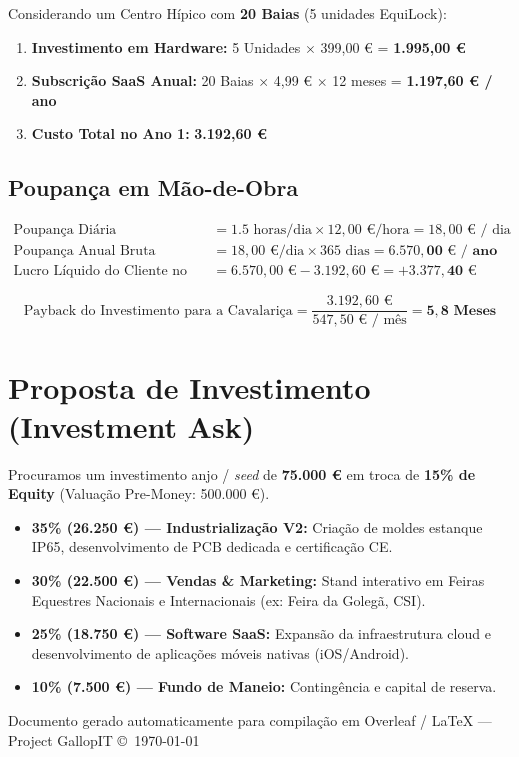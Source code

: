 \documentclass[11pt,a4paper]{article}
\begin{document}
Considerando um Centro Hípico com \textbf{20 Baias} (5 unidades EquiLock):
\begin{enumerate}
    \item \textbf{Investimento em Hardware:} 5 Unidades $\times$ 399,00 € = \textbf{1.995,00 €}
    \item \textbf{Subscrição SaaS Anual:} 20 Baias $\times$ 4,99 € $\times$ 12 meses = \textbf{1.197,60 € / ano}
    \item \textbf{Custo Total no Ano 1:} \textbf{3.192,60 €}
\end{enumerate}

\subsection{Poupança em Mão-de-Obra}
\begin{align*}
\text{Poupança Diária} &= 1.5\text{ horas/dia} \times 12,00\text{ €/hora} = 18,00\text{ € / dia} \\
\text{Poupança Anual Bruta} &= 18,00\text{ €/dia} \times 365\text{ dias} = \mathbf{6.570,00\text{ € / ano}} \\
\text{Lucro Líquido do Cliente no Ano 1} &= 6.570,00\text{ €} - 3.192,60\text{ €} = \mathbf{+3.377,40\text{ €}}
\end{align*}

\[
\text{Payback do Investimento para a Cavalariça} = \frac{3.192,60\text{ €}}{547,50\text{ € / mês}} = \mathbf{5,8\text{ Meses}}
\]

\section{Proposta de Investimento (Investment Ask)}

Procuramos um investimento anjo / \emph{seed} de \textbf{75.000 €} em troca de \textbf{15\% de Equity} (Valuação Pre-Money: 500.000 €).

\begin{highlightbox}[title=Alocação dos Fundos (75.000 €)]
\begin{itemize}[leftmargin=*]
    \item \textbf{35\% (26.250 €) --- Industrialização V2:} Criação de moldes estanque IP65, desenvolvimento de PCB dedicada e certificação CE.
    \item \textbf{30\% (22.500 €) --- Vendas \& Marketing:} Stand interativo em Feiras Equestres Nacionais e Internacionais (ex: Feira da Golegã, CSI).
    \item \textbf{25\% (18.750 €) --- Software SaaS:} Expansão da infraestrutura cloud e desenvolvimento de aplicações móveis nativas (iOS/Android).
    \item \textbf{10\% (7.500 €) --- Fundo de Maneio:} Contingência e capital de reserva.
\end{itemize}
\end{highlightbox}

\vspace{0.5cm}
\begin{center}
    {\small \color{darkgray} Documento gerado automaticamente para compilação em Overleaf / LaTeX --- Project GallopIT \copyright\ \today}
\end{center}
\end{document}
